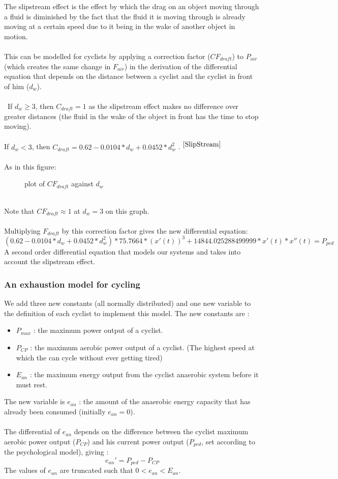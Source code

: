 \documentclass[10pt, a4paper]{report}
\begin{document}
The slipstream effect is the effect by which the drag on an object moving through a fluid is diminished by the fact that the fluid it is moving through is already moving at a certain speed due to it being in the wake of another object in motion. \\\\
This can be modelled for cyclists by applying a correction factor ($CF_{draft}$) to $P_{air}$ (which creates the same change in $F_{air}$) in the derivation of the differential equation that depends on the distance between a cyclist and the cyclist in front of him ($d_w$). \\\\\
If $d_w \ge 3$, then $C_{draft} = 1$ as the slipstream effect makes no difference over greater distances (the fluid in the wake of the object in front has the time to stop moving). \\\\
If $d_w < 3$, then $C_{draft} = 0.62 - 0.0104*d_w + 0.0452*d_w^2$ . $^{\cite{SlipStream}}$ \\\\
As in this figure:
\begin{figure}[!ht]
  \centering
    
  \caption{plot of $CF_{draft}$ against $d_w$}
\end{figure}
\\
Note that $CF_{draft} \approx 1$ at $d_w = 3$ on this graph. \\\\
Multiplying $F_{draft}$ by this correction factor gives the new differential equation:
$$ (0.62 - 0.0104*d_w + 0.0452*d_w^2) * 75.7664 *(x'(t))^{3} + 14844.025288499999 * x'(t) * x''(t) = P_{ped}$$
A second order differential equation that models our systems and takes into account the slipstream effect.

\subsubsection{An exhaustion model for cycling}

We add three new constants (all normally distributed) and one new variable to the definition of each cyclist to implement this model. The new constants are :
\begin{itemize}
\item $P_{max}$ : the maximum power output of a cyclist.
\item $P_{CP}$ : the maximum aerobic power output of a cyclist. (The highest speed at which the can cycle without ever getting tired)
\item $E_{an}$ : the maximum energy output from the cyclist anaerobic system before it must rest.
\end{itemize}
The new variable is $e_{an}$ : the amount of the anaerobic energy capacity that has already been consumed (initially $e_{an} = 0$). \\\\
The differential of $e_{an}$ depends on the difference between the cyclist maximum aerobic power output ($P_{CP}$) and his current power output ($P_{ped}$, set according to the psychological model), giving :
$$ e_{an}' = P_{ped} - P_{CP} $$
The values of $e_{an}$ are truncated such that $0 < e_{an} < E_{an}$.
\end{document}
